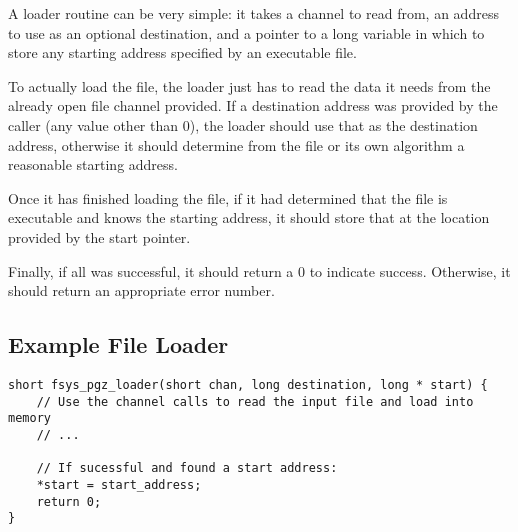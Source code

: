 A loader routine can be very simple: it takes a channel to read from, an address to use as an optional destination, and a pointer to a long variable in which to store any starting address specified by an executable file.

To actually load the file, the loader just has to read the data it needs from the already open file channel provided. If a destination address was provided by the caller (any value other than 0), the loader should use that as the destination address, otherwise it should determine from the file or its own algorithm a reasonable starting address.

Once it has finished loading the file, if it had determined that the file is executable and knows the starting address, it should store that at the location provided by the start pointer.

Finally, if all was successful, it should return a 0 to indicate success. Otherwise, it should return an appropriate error number.

\subsection*{Example File Loader}
\begin{lstlisting}
short fsys_pgz_loader(short chan, long destination, long * start) {
    // Use the channel calls to read the input file and load into memory
    // ...

    // If sucessful and found a start address:
    *start = start_address;
    return 0;
}
\end{lstlisting}